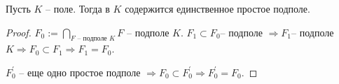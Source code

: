 \documentclass[main]{subfiles}
\begin{document}
\begin{proposition}
    Пусть $K$ -- поле. Тогда в $K$ содержится единственное простое подполе.
\end{proposition}
\begin{proof}
    $F_0 := \bigcap_{F \text{ -- подполе } K} F$ -- подполе $K$. $F_1 \subset F_0$-- подполе $\Rightarrow F_1$-- подполе 
    $K \Rightarrow F_0 \subset F_1 \Rightarrow F_1 = F_0$.
    
    $F_0^\prime$ -- еще одно простое подполе $ \Rightarrow  F_0 \subset F^\prime_0 \Rightarrow F^\prime_0 = F_0$.
\end{proof}
\end{document}
